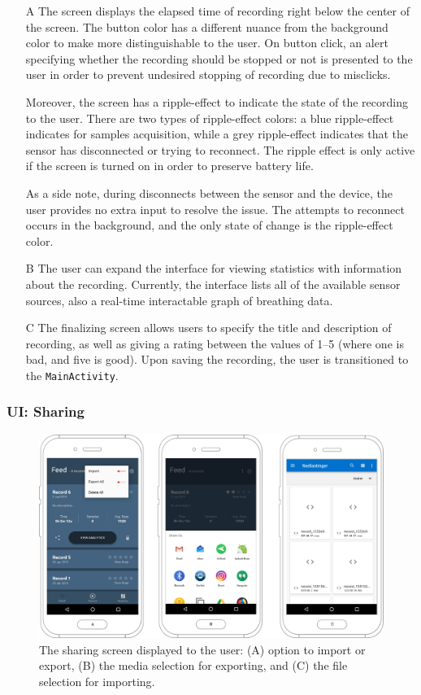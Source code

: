 \begin{itemize}
    \item[A] The screen displays the elapsed time of recording right below the center of the screen. The button color has a different nuance from the background color to make more distinguishable to the user. On button click, an alert specifying whether the recording should be stopped or not is presented to the user in order to prevent undesired stopping of recording due to misclicks. 
    
    Moreover, the screen has a ripple-effect to indicate the state of the recording to the user. There are two types of ripple-effect colors: a blue ripple-effect indicates for samples acquisition, while a grey ripple-effect indicates that the sensor has disconnected or trying to reconnect. The ripple effect is only active if the screen is turned on in order to preserve battery life. 
    
    As a side note, during disconnects between the sensor and the device, the user provides no extra input to resolve the issue. The attempts to reconnect occurs in the background, and the only state of change is the ripple-effect color. 
    \item[B] The user can expand the interface for viewing statistics with information about the recording. Currently, the interface lists all of the available sensor sources, also a real-time interactable graph of breathing data.
    \item[C] The finalizing screen allows users to specify the title and description of recording, as well as giving a rating between the values of 1--5 (where one is bad, and five is good). Upon saving the recording, the user is transitioned to the \verb|MainActivity|.

\end{itemize}

\subsubsection{UI: Sharing}
\begin{figure}[!h]
    \centering
    \includegraphics[scale=0.26]{images/Sharing_img.pdf}
    \caption{The sharing screen displayed to the user: (A) option to import or export, (B) the media selection for exporting, and (C) the file selection for importing.}
    \label{fig:screen_sharing}
\end{figure}

